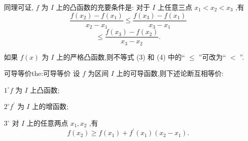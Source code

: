 同理可证, \(f\) 为 \(I\) 上的凸函数的充要条件是: 对于 \(I\) 上任意三点 \({x}_{1} < {x}_{2} < {x}_{3}\) ,有
\[
\frac{f\left( {x}_{2}\right)  - f\left( {x}_{1}\right) }{{x}_{2} - {x}_{1}} \leq  \frac{f\left( {x}_{3}\right)  - f\left( {x}_{1}\right) }{{x}_{3} - {x}_{1}}
\]
\[
\leq  \frac{f\left( {x}_{3}\right)  - f\left( {x}_{2}\right) }{{x}_{3} - {x}_{2}}. \tag{4}
\]

\begin{remark}
如果 \(f\left( x\right)\) 为 \(I\) 上的严格凸函数,则不等式 (3) 和 (4) 中的“ \(\leq\) ”可改为“ \(<\) ”.
\end{remark}


\begin{theorem}{可导等价}{the:可导等价}
设 \(f\) 为区间 \(I\) 上的可导函数,则下述论断互相等价:

\({1}^{ \circ  }f\) 为 \(I\) 上凸函数;

\({2}^{ \circ  }{f}^{\prime }\) 为 \(I\) 上的增函数;

\({3}^{ \circ  }\) 对 \(I\) 上的任意两点 \({x}_{1},{x}_{2}\) ,有
\[
f\left( {x}_{2}\right)  \geq  f\left( {x}_{1}\right)  + {f}^{\prime }\left( {x}_{1}\right) \left( {{x}_{2} - {x}_{1}}\right) . \tag{5}
\]
\end{theorem}

